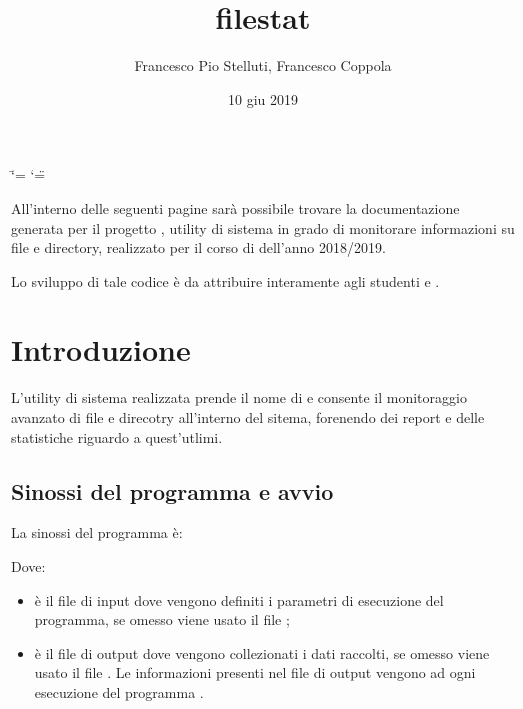 \documentclass[letterpaper,10pt,italian,openany,oneside]{sphinxmanual}
\title{filestat}
\date{10 giu 2019}
\author{Francesco Pio Stelluti, Francesco Coppola}
\begin{document}
\ifdefined\shorthandoff
  \ifnum\catcode`\=\string=\active\shorthandoff{=}\fi
  \ifnum\catcode`\"=\active{}\fi
\fi

\pagestyle{empty}
\sphinxmaketitle
\pagestyle{plain}
\sphinxtableofcontents
\pagestyle{normal}
\label{\detokenize{index::doc}}


All’interno delle seguenti pagine sarà possibile trovare la documentazione
generata per il progetto , utility di sistema in grado di monitorare informazioni
su file e directory, realizzato per il corso di 
dell’anno 2018/2019.

Lo sviluppo di tale codice è da attribuire interamente agli studenti  e .


\chapter{Introduzione}
\label{\detokenize{introduzione:introduzione}}\label{\detokenize{introduzione::doc}}\begin{quote}

\end{quote}

L’utility di sistema realizzata prende il nome di  e consente il monitoraggio avanzato di
file e direcotry all’interno del sitema, forenendo dei report e delle statistiche riguardo a quest’utlimi.


\section{Sinossi del programma e avvio}
\label{\detokenize{introduzione:sinossi-del-programma-e-avvio}}
La sinossi del programma è:

\begin{sphinxVerbatim}[commandchars=\\\{\}]
 \PYG{p}{[}\PYG{p}{]} \PYG{p}{[}\PYG{p}{]} \PYG{p}{[}\PYG{p}{]}
\end{sphinxVerbatim}

Dove:
\begin{itemize}
\item {} 
 è il file di input dove vengono definiti i parametri di esecuzione del programma, se omesso viene usato il file ;

\item {} 
 è il file di output dove vengono collezionati i dati raccolti, se omesso viene usato il file . Le informazioni presenti nel file di output vengono  ad ogni esecuzione del programma .

\end{itemize}
\end{document}
